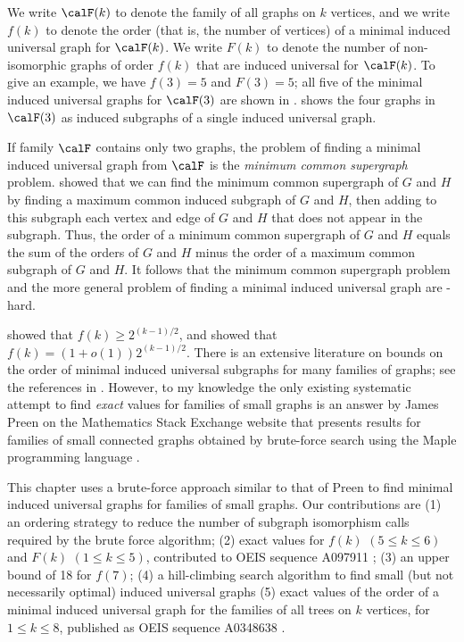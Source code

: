 We write $\calF(k)$ to denote the family of all graphs on $k$ vertices,
and we write $f(k)$ to denote the order (that is, the
number of vertices) of a minimal induced universal graph for $\calF(k)$.
We write $F(k)$ to denote the number of non-isomorphic graphs of order $f(k)$
that are induced universal for $\calF(k)$.
To give an example, we have $f(3)=5$ and $F(3)=5$; all five of the minimal
induced universal graphs
for $\calF(3)$ are shown in .  shows the four
graphs in $\calF(3)$ as induced subgraphs of a single induced universal graph.

If family $\calF$ contains only two graphs, the problem of finding a minimal
induced universal graph from $\calF$ is the \emph{minimum common supergraph}
problem.  \citet{DBLP:journals/computing/BunkeJK00}
showed that we can find the minimum common supergraph of $G$ and $H$ by
finding a maximum common induced subgraph of $G$ and $H$, then adding to this
subgraph each vertex and edge of $G$ and $H$ that does not appear in the subgraph.
Thus, the order of a minimum common supergraph of $G$ and $H$ equals the sum
of the orders of $G$ and $H$ minus the order of a maximum common subgraph
of $G$ and $H$.  It follows that the minimum common supergraph problem
and the more general problem of finding a minimal induced universal graph
are \NP-hard.

\citet{moon_1965} showed that $f(k) \geq 2^{(k-1)/2}$,
and \citet{alon2017asymptotically} showed that $f(k) = (1 + o(1))2^{(k-1)/2}$.
There is an extensive literature on bounds on
the order of minimal induced universal subgraphs for many families of graphs;
see the references in \cite{alon2017asymptotically}.
However, to my knowledge the only
existing systematic attempt to find \emph{exact} values for families of small
graphs is an answer by James Preen on the Mathematics Stack Exchange website that
presents results for families of small connected graphs obtained by brute-force
search using the Maple programming language \citep{preen_math_se}.

This chapter uses a brute-force approach similar to that of Preen to find minimal
induced universal graphs for families of small graphs.  Our contributions
are (1) an ordering strategy to reduce the number of subgraph isomorphism
calls required by the brute force algorithm; (2) exact values for $f(k)$ $(5 \leq k \leq 6)$
and $F(k)$ $(1 \leq k \leq 5)$,
contributed to OEIS sequence A097911 \citep{oeisA097911};
(3) an upper bound of 18 for $f(7)$; (4) a hill-climbing
search algorithm to find small (but not necessarily optimal) induced universal graphs
(5) exact values of the order of a minimal induced universal graph
for the families of all trees on $k$ vertices, for $1 \leq k \leq 8$,
published as OEIS sequence A0348638 \citep{oeisA348638}.

